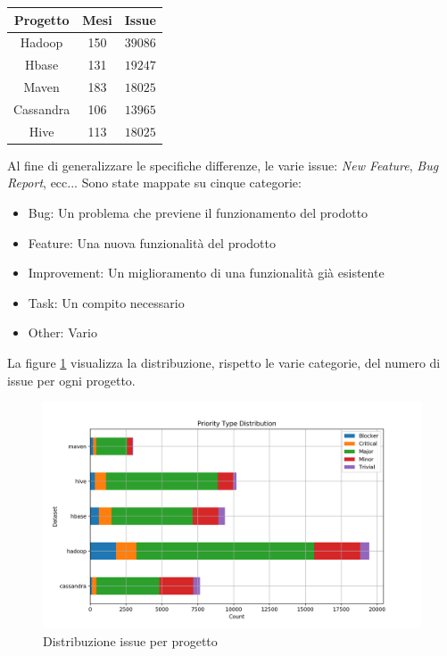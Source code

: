 \documentclass[%
    corpo=12pt,
    twoside,
    oldstyle,
    autoretitolo,
    greek,
    evenboxes,
]{toptesi}
\begin{document}
\begin{center}
   \label{tab:seoss33_selected}
  \begin{tabular}{ |c|c|c| }
     \hline
     \textbf{Progetto} & \textbf{Mesi} & \textbf{Issue} \\
     \hline
     \hline
     Hadoop & 150 & $39086$ \\
     Hbase & 131 & $19247$ \\
     Maven & 183 & $18025$ \\
     Cassandra & 106 & $13965$ \\
     Hive & 113 & $18025$ \\
     \hline
  \end{tabular}
\end{center}

Al fine di generalizzare le specifiche differenze, le varie issue: \textit{New Feature}, \textit{Bug Report}, ecc... Sono state mappate su cinque categorie:
\begin{itemize}
  \item Bug: Un problema che previene il funzionamento del prodotto
  \item Feature: Una nuova funzionalità del prodotto
  \item Improvement: Un miglioramento di una funzionalità già esistente
  \item Task: Un compito necessario
  \item Other: Vario
\end{itemize}

La figure \ref{fig:prior} visualizza la distribuzione, rispetto le varie categorie, del numero di issue per ogni progetto.

\begin{figure}[!ht]
  \includegraphics[width=\linewidth]{figure/prior.png}
  \caption{Distribuzione issue per progetto}
  \label{fig:prior}
\end{figure}
\end{document}
